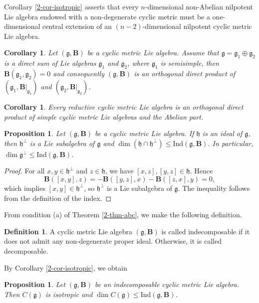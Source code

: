 \documentclass[reqno]{amsart}
\newtheorem{prop}[thm]{Proposition}
\newtheorem{cor}[thm]{Corollary}
\theoremstyle{definition}
\newtheorem{defn}[thm]{Definition}
\begin{document}
Corollary \ref{2-cor-isotropic} asserts that every $n$-dimensional non-Abelian nilpotent Lie algebra endowed with a non-degenerate cyclic metric must be a one-dimensional central extension of an $(n-2)$-dimensional nilpotent
cyclic metric Lie algebra.
\begin{cor}\label{2-cor-twodirectsum}
Let $(\mathfrak{g}, \mathbf{B})$ be a cyclic metric Lie algebra.
Assume that $\mathfrak{g}=\mathfrak{g}_{1}\oplus\mathfrak{g}_{2}$ is a direct sum of Lie algebras $\mathfrak{g}_{1}$ and $\mathfrak{g}_{2}$, where $\mathfrak{g}_{1}$ is semisimple, then
$\mathbf{B}(\mathfrak{g}_{1},\mathfrak{g}_{2})=0$ and consequently $(\mathfrak{g}, \mathbf{B})$ is an orthogonal direct product of $(\mathfrak{g}_{1},\mathbf{B}|_{\mathfrak{g}_{1}})$ and
$(\mathfrak{g}_{2},\mathbf{B}|_{\mathfrak{g}_{2}})$.
\end{cor}
\begin{cor}\label{2-cor-reductive}
Every reductive cyclic metric Lie algebra is an orthogonal direct product of simple cyclic metric Lie algebras and the Abelian part.
\end{cor}

\begin{prop}
Let $(\mathfrak{g}, \mathbf{B})$ be a cyclic metric Lie algebra.
If  $\mathfrak{h}$ is an ideal of $\mathfrak{g}$,
then  $\mathfrak{h}^{\perp}$ is a Lie subalgebra of $\mathfrak{g}$ and
$\dim (\mathfrak{h}\cap \mathfrak{h}^{\perp})\leq \mathrm{Ind}(\mathfrak{g},\mathbf{B})$.
In particular, $\dim \mathfrak{g}^{\perp}\leq \mathrm{Ind}(\mathfrak{g},\mathbf{B})$.
\end{prop}
\begin{proof}
 For all $x,y\in\mathfrak{h}^{\perp}$ and  $z\in\mathfrak{h}$, we have $[x,z],[y,z]\in \mathfrak{h}$.
  Hence
\begin{equation*}
\mathbf{B}([x,y],z)=-\mathbf{B}([y,z],x)-\mathbf{B}([z,x],y)=0,
\end{equation*}
which implies  $[x,y]\in \mathfrak{h}^{\perp}$,  so $\mathfrak{h}^{\perp}$ is a Lie  subalgebra of $\mathfrak{g}$. The inequality follows from the definition of the index.
\end{proof}




From condition (a) of Theorem \ref{2-thm-abc}, we make the following definition.
\begin{defn}
A cyclic metric Lie algebra $(\mathfrak{g},\mathbf{B})$ is called indecomposable if it does not admit any non-degenerate proper ideal. Otherwise, it is called decomposable.
\end{defn}
By Corollary \ref{2-cor-isotropic}, we obtain
\begin{prop}
Let $(\mathfrak{g},\mathbf{B})$ be an indecomposable cyclic metric Lie algebra. Then $C(\mathfrak{g})$ is isotropic and
$\dim C(\mathfrak{g})\leq \mathrm{Ind}(\mathfrak{g},\mathbf{B})$.
\end{prop}
\end{document}
